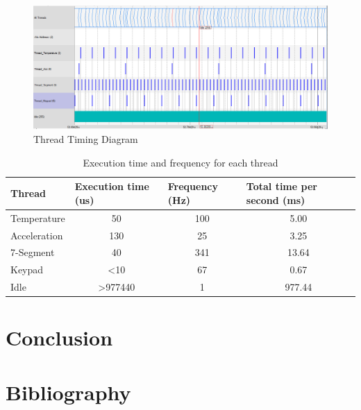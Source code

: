 \documentclass[12pt]{article}
\begin{document}
\begin{figure}[!htb]
 \centering
 \includegraphics[scale=0.50]{images/threads1.png}
 \caption{Thread Timing Diagram}
 \label{fig:threadstiming}
\end{figure}



\begin{table}[]
\centering
\caption{Execution time and frequency for each thread}
\label{Table_threads}
\begin{tabular}{|l|c|c|c|}
\hline
\textbf{Thread} & \multicolumn{1}{l|}{\textbf{Execution time (us)}} & \multicolumn{1}{l|}{\textbf{Frequency (Hz)}} & \multicolumn{1}{l|}{\textbf{Total time per second (ms)}} \\ \hline
Temperature     & 50                                           & 100                                     & 5.00                                                \\ \hline
Acceleration    & 130                                          & 25                                      & 3.25                                                \\ \hline
7-Segment       & 40                                           & 341                                     & 13.64                                               \\ \hline
Keypad          & \textless10                                  & 67                                      & 0.67                                                \\ \hline
Idle            & \textgreater977440                           & 1                                       & 977.44                                              \\ \hline
\end{tabular}
\end{table}



\section{Conclusion}

\newpage
\section{Bibliography}

 
\end{document}
